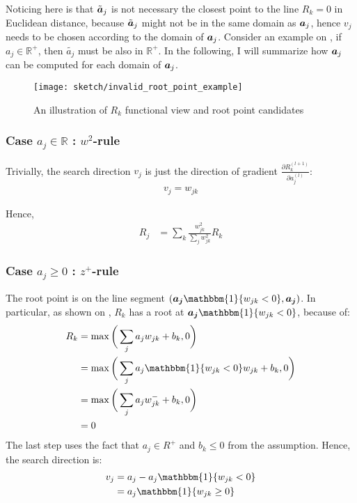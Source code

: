 Noticing here is that $\tilde{\patvector{a}}_j$ is not necessary the closest point to the line $R_k=0$ in Euclidean distance, because  $\tilde{\patvector{a}}_j$  might not be in the same domain as $\patvector{a}_j$, hence $v_j$ needs to be chosen according to the domain of $\patvector{a}_j$. Consider an example on \addfigure{\ref{fig:root_point_illus}}, if $a_j \in \mathbb{R}^+$, then $\widetilde{a_j}$ must be also in $\mathbb{R}^+$.   In the following, I will summarize how $\patvector{a}_j$ can be computed for each domain of $\patvector{a}_j$.

\begin{figure}[h]
\centering
\texttt{[image: sketch/invalid\_root\_point\_example]}
\caption{An illustration of $R_k$ functional view and root point candidates}
\label{fig:root_point_illus}
\end{figure}

\subsubsection{Case $a_j \in \mathbb{R}$ : $w^2$-rule}

Trivially, the search direction $v_j$ is just the direction of gradient $\frac{\partial  R_k^{(l+1)} }{ \partial a_j^{(l)} }$:
\begin{align*}
	v_j = w_{jk}
\end{align*}

Hence, 
\begin{align*}
	R_j &=	\sum_k \frac{ w_{jk}^2  }{\sum_{j} w_{jk}^2}  R_k
\end{align*}

\subsubsection{Case $a_j \ge 0$ : $z^+$-rule}
The root point is on the line segment $( \patvector{a_j} \mathbbm{1}\{ w_{jk}  < 0 \}, \patvector{a_j} )$. In particular, as shown on \addfigure{\ref{fig:zplus_rule_cases}}, $R_k$ has a root at $\patvector{a_j} \mathbbm{1}\{ w_{jk}  < 0 \}$, because of:
\begin{align}	
R_k &= \max \bigg( \sum_j a_j w_{jk } + b_k, 0 \bigg) \\
&=  \max \bigg( \sum_j a_j \mathbbm{1}\{ w_{jk}  < 0 \} w_{jk} + b_k, 0 \bigg) \\
&=  \max \bigg(\sum_j a_j  w_{jk}^- + b_k , 0\bigg) \\
&= 0 \label{eq:zplus_rk_zero}
\end{align}
The last step uses the fact that $a_j \in R^+$ and $b_k \le 0$ from the assumption. Hence, the search direction is:
\begin{align*}
	v_j &= a_j - a_j \mathbbm{1}\{ w_{jk}  < 0 \} \\
	&= a_j \mathbbm{1}\{ w_{jk}  \ge 0 \}
\end{align*}

